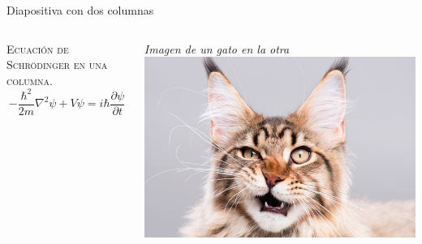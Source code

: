 \documentclass{beamer}
\begin{document}
    \begin{frame}{Diapositiva con dos columnas}
        \begin{columns}[totalwidth=\textwidth]
            \begin{column}[t]{0.5\textwidth}
            \centering
            \textsc{Ecuación de Schrödinger en una columna}.
            \vspace{0.5cm}
            \begin{equation*}
                -\frac{\hbar^2}{2m}\nabla^2\psi + V\psi =  i\hbar\frac{\partial \psi}{\partial t}
            \end{equation*}
            \end{column}
            \vrule{}
            \begin{column}[t]{0.5\textwidth}
                \centering
                \emph{\textrm{Imagen de un gato en la otra}}\\ [2ex]
                \centering
                \includegraphics[width=0.8\linewidth]{gato.jpeg}
            \end{column}
        \end{columns}        
    \end{frame}
\end{document}
